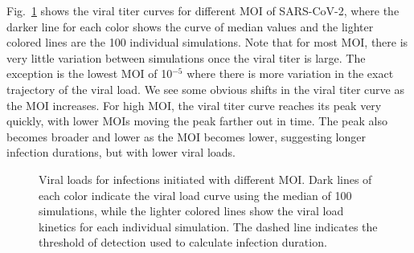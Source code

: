 Fig.\ \ref{curves} shows the viral titer curves for different MOI of SARS-CoV-2, where the darker line for each color shows the curve of median values and the lighter colored lines are the 100 individual simulations. Note that for most MOI, there is very little variation between simulations once the viral titer is large. The exception is the lowest MOI of 10$^{-5}$ where there is more variation in the exact trajectory of the viral load. We see some obvious shifts in the viral titer curve as the MOI increases. For high MOI, the viral titer curve reaches its peak very quickly, with lower MOIs moving the peak farther out in time. The peak also becomes broader and lower as the MOI becomes lower, suggesting longer infection durations, but with lower viral loads.
\begin{figure}[!h]
\begin{center}
\caption{Viral loads for infections initiated with different MOI. Dark lines of each color indicate the viral load curve using the median of 100 simulations, while the lighter colored lines show the viral load kinetics for each individual simulation. The dashed line indicates the threshold of detection used to calculate infection duration. \label{curves}}
\end{center}
\end{figure}

